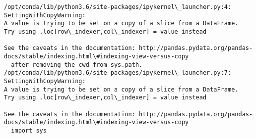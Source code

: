 \documentclass[11pt]{article}
\begin{document}
    \begin{Verbatim}[commandchars=\\\{\}]
/opt/conda/lib/python3.6/site-packages/ipykernel\_launcher.py:4: SettingWithCopyWarning: 
A value is trying to be set on a copy of a slice from a DataFrame.
Try using .loc[row\_indexer,col\_indexer] = value instead

See the caveats in the documentation: http://pandas.pydata.org/pandas-docs/stable/indexing.html\#indexing-view-versus-copy
  after removing the cwd from sys.path.
/opt/conda/lib/python3.6/site-packages/ipykernel\_launcher.py:7: SettingWithCopyWarning: 
A value is trying to be set on a copy of a slice from a DataFrame.
Try using .loc[row\_indexer,col\_indexer] = value instead

See the caveats in the documentation: http://pandas.pydata.org/pandas-docs/stable/indexing.html\#indexing-view-versus-copy
  import sys

    \end{Verbatim}
\end{document}
